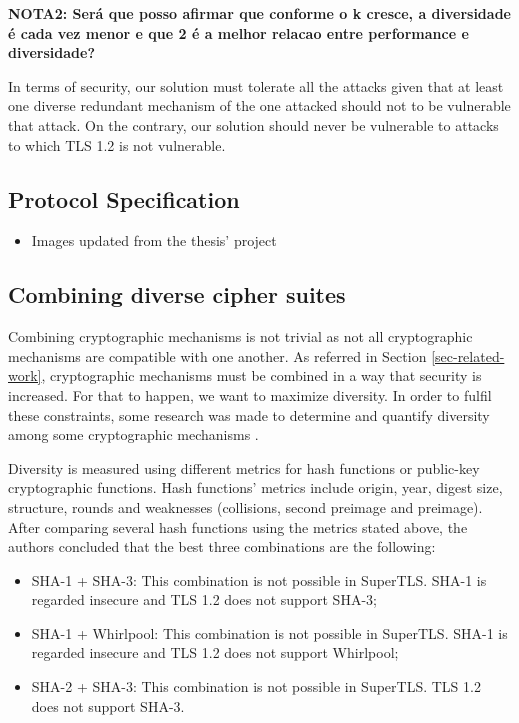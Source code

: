 \documentclass{sig-alternate-05-2015}
\begin{document}
\textbf{NOTA2: Ser\'a que posso afirmar que conforme o k cresce, a diversidade \'e cada vez menor e que 2 \'e a melhor relacao entre performance e diversidade?}

In terms of security, our solution must tolerate all the attacks given that at least one diverse redundant mechanism of the one attacked should not to be vulnerable that attack. On the contrary, our solution should never be vulnerable to attacks to which TLS 1.2 is not vulnerable.

\subsection{Protocol Specification}

\begin{itemize}
\item Images updated from the thesis' project
\end{itemize}

\subsection{Combining diverse cipher suites}

Combining cryptographic mechanisms is not trivial as not all cryptographic mechanisms are compatible with one another. As referred in Section \ref{sec-related-work}, cryptographic mechanisms must be combined in a way that security is increased. For that to happen, we want to maximize diversity.
In order to fulfil these constraints, some research was made to determine and quantify diversity among some cryptographic mechanisms \cite{CarvalhoThesis14}.

Diversity is measured using different metrics for hash functions or public-key cryptographic functions. Hash functions' metrics include origin, year, digest size, structure, rounds and weaknesses (collisions, second preimage and preimage).
After comparing several hash functions using the metrics stated above, the authors concluded that the best three combinations are the following:
\begin{itemize}
\item {SHA-1 + SHA-3: This combination is not possible in SuperTLS. SHA-1 is regarded insecure and TLS 1.2 does not support SHA-3;}
\item {SHA-1 + Whirlpool: This combination is not possible in SuperTLS. SHA-1 is regarded insecure and TLS 1.2 does not support Whirlpool;} 
\item {SHA-2 + SHA-3: This combination is not possible in SuperTLS. TLS 1.2 does not support SHA-3.}
\end{itemize}
\end{document}
